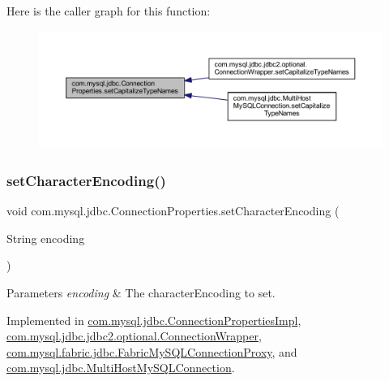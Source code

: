 Here is the caller graph for this function\+:\nopagebreak
\begin{figure}[H]
\begin{center}
\leavevmode
\includegraphics[width=350pt]{interfacecom_1_1mysql_1_1jdbc_1_1_connection_properties_a4a5d21e7dfd9bedd2eb10f3169629288_icgraph}
\end{center}
\end{figure}
\mbox{\label{interfacecom_1_1mysql_1_1jdbc_1_1_connection_properties_ac5db9f2921918f0a5d1f55ce5e093948}} 
\subsubsection{\texorpdfstring{set\+Character\+Encoding()}{setCharacterEncoding()}}
{\footnotesize\ttfamily void com.\+mysql.\+jdbc.\+Connection\+Properties.\+set\+Character\+Encoding (\begin{DoxyParamCaption}\item[{String}]{encoding }\end{DoxyParamCaption})}


\begin{DoxyParams}{Parameters}
{\em encoding} & The character\+Encoding to set. \\
\hline
\end{DoxyParams}


Implemented in \mbox{\hyperlink{classcom_1_1mysql_1_1jdbc_1_1_connection_properties_impl_a53359a702ef9b70edc1c05f9160c5de6}{com.\+mysql.\+jdbc.\+Connection\+Properties\+Impl}}, \mbox{\hyperlink{classcom_1_1mysql_1_1jdbc_1_1jdbc2_1_1optional_1_1_connection_wrapper_a7f74453daef3b82cf585f58cb4c1e820}{com.\+mysql.\+jdbc.\+jdbc2.\+optional.\+Connection\+Wrapper}}, \mbox{\hyperlink{classcom_1_1mysql_1_1fabric_1_1jdbc_1_1_fabric_my_s_q_l_connection_proxy_a37c25fb3919cf607240217459b1a19e3}{com.\+mysql.\+fabric.\+jdbc.\+Fabric\+My\+S\+Q\+L\+Connection\+Proxy}}, and \mbox{\hyperlink{classcom_1_1mysql_1_1jdbc_1_1_multi_host_my_s_q_l_connection_a1510cc6e9c664cb49832bb26ae148e06}{com.\+mysql.\+jdbc.\+Multi\+Host\+My\+S\+Q\+L\+Connection}}.

